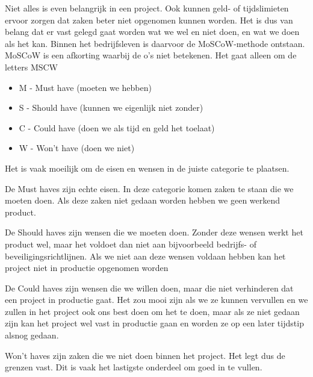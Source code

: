 
Niet alles is even belangrijk in een project. Ook kunnen geld- of tijdslimieten ervoor zorgen dat zaken beter niet opgenomen kunnen worden. Het is dus van belang dat er vast gelegd gaat worden wat we wel en niet doen, en wat we doen als het kan. Binnen het bedrijfsleven is daarvoor de MoSCoW-methode ontstaan. MoSCoW is een afkorting waarbij de o's niet betekenen. Het gaat alleen om de letters MSCW

\begin{itemize}
\item M - Must have (moeten we hebben)
\item S - Should have (kunnen we eigenlijk niet zonder)
\item C - Could have (doen we als tijd en geld het toelaat)
\item W - Won't have (doen we niet)
\end{itemize}

Het is vaak moeilijk om de eisen en wensen in de juiste categorie te plaatsen.

De Must haves zijn echte eisen. In deze categorie komen zaken te staan die we moeten doen. Als deze zaken niet gedaan worden hebben we geen werkend product.

De Should haves zijn wensen die we moeten doen. Zonder deze wensen werkt het product wel, maar het voldoet dan niet aan bijvoorbeeld bedrijfs- of beveiligingsrichtlijnen. Als we niet aan deze wensen voldaan hebben kan het project niet in productie opgenomen worden

De Could haves zijn wensen die we willen doen, maar die niet verhinderen dat een project in productie gaat. Het zou mooi zijn als we ze kunnen vervullen en we zullen in het project ook ons best doen om het te doen, maar als ze niet gedaan zijn kan het project wel vast in productie gaan en worden ze op een later tijdstip alsnog gedaan.

Won't haves zijn zaken die we niet doen binnen het project. Het legt dus de grenzen vast. Dit is vaak het lastigste onderdeel om goed in te vullen.

